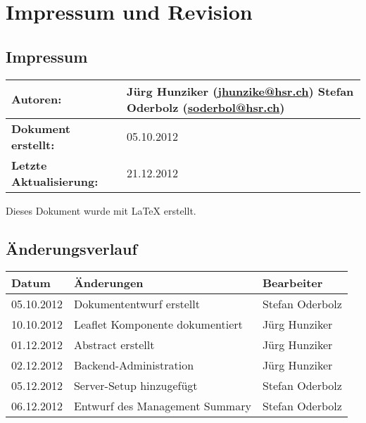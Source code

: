 \chapter*{Impressum und Revision}

\section*{Impressum}
\begin{table}[H] 
\centering 
\begin{tabular}{|p{0.35\twocelltabwidth}|p{0.65\twocelltabwidth}|}
\hline 
\textbf{Autoren:} & Jürg Hunziker (\url{jhunzike@hsr.ch}) \newline
Stefan Oderbolz (\url{soderbol@hsr.ch}) \\ 
\hline 
\textbf{Dokument erstellt:} & 05.10.2012 \\ 
\hline 
\textbf{Letzte Aktualisierung:} & 21.12.2012 \\ 
\hline 
\end{tabular}
\end{table}

Dieses Dokument wurde mit \LaTeX{} erstellt.

\section*{Änderungsverlauf}

\begin{longtable}{|p{0.15\threecelltabwidth}|p{0.65\threecelltabwidth}|p{0.2\threecelltabwidth}|}
\hline 
\textbf{Datum} & \textbf{Änderungen} & \textbf{Bearbeiter} \\ 
\hline 
05.10.2012 & Dokumententwurf erstellt & Stefan Oderbolz \\ 
\hline 
10.10.2012 & Leaflet Komponente dokumentiert & Jürg Hunziker \\ 
\hline 
01.12.2012 & Abstract erstellt & Jürg Hunziker \\ 
\hline 
02.12.2012 & Backend-Administration & Jürg Hunziker \\ 
\hline
05.12.2012 & Server-Setup hinzugefügt & Stefan Oderbolz \\ 
\hline 
06.12.2012 & Entwurf des Management Summary & Stefan Oderbolz \\ 
\hline 
\end{longtable} 
